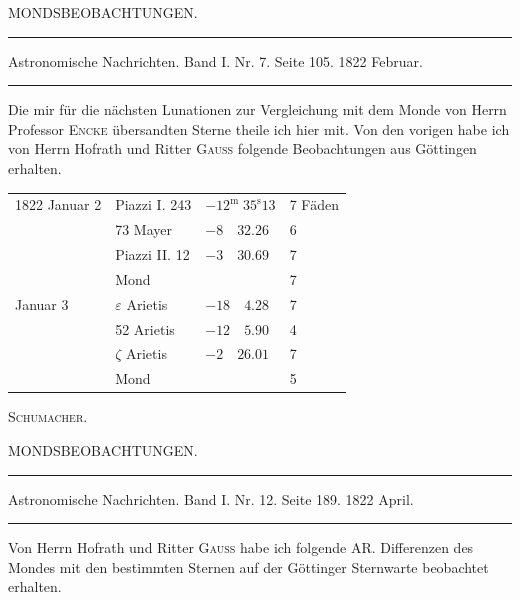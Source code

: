 \clearpage
{}
\begin{center}
{\large MONDSBEOBACHTUNGEN.}

\noindent\rule{\linewidth}{0.4pt}

Astronomische Nachrichten. Band I. Nr. 7. Seite 105. 1822 Februar.

\noindent\rule{\linewidth}{0.4pt}
\end{center}

Die mir für die nächsten Lunationen zur Vergleichung mit dem Monde von Herrn Professor \textsc{Encke} übersandten Sterne theile ich hier mit. Von den vorigen habe ich von Herrn Hofrath und Ritter \textsc{Gauss} folgende Beobachtungen aus Göttingen erhalten.

\begin{center}
\begin{tabular}{l|l|l|l}
1822 Januar 2 & Piazzi I. 243 & $-12^{\mathrm{m}}\;35^{\mathrm{s}}13$ & 7 Fäden \\
 & 73 Mayer & $-8\quad32.26$ & 6 \\
 & Piazzi II. 12 & $-3\quad30.69$ & 7 \\
 & Mond & & 7 \\
Januar 3 & $\varepsilon$ Arietis & $-18\quad4.28$ & 7 \\
 & 52 Arietis & $-12\quad5.90$ & 4 \\
 & $\zeta$ Arietis & $-2\quad26.01$ & 7 \\
 & Mond & & 5 \\
\end{tabular}
\end{center}

\begin{flushright}
\textsc{Schumacher}.
\end{flushright}

\clearpage
\hypertarget{native-446-part-lower}{}
\begin{center}
{\large MONDSBEOBACHTUNGEN.}

\noindent\rule{\linewidth}{0.4pt}

Astronomische Nachrichten. Band I. Nr. 12. Seite 189. 1822 April.

\noindent\rule{\linewidth}{0.4pt}
\end{center}

Von Herrn Hofrath und Ritter \textsc{Gauss} habe ich folgende AR. Differenzen des Mondes mit den bestimmten Sternen auf der Göttinger Sternwarte beobachtet erhalten.

